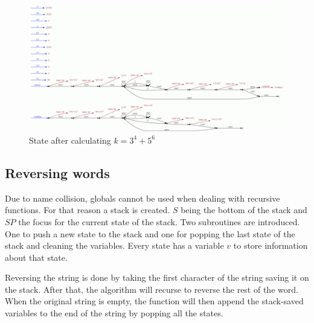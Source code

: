 \documentclass[a4paper,12px]{article}
\begin{document}
\inputminted[bgcolor=bg]{C}{power.mspea}

\begin{figure}[h]
    \centering
    \includegraphics[width=0.8\linewidth]{power_mspea.png}
    \caption{State after calculating $k = 3^4 + 5^6$}
\end{figure}
\FloatBarrier%

\subsection{Reversing words}
Due to name collision, globals cannot be used when dealing with recursive functions. For that reason a stack is created. $S$ being the bottom of the stack and $SP$ the focus for the current state of the stack. Two subroutines are introduced. One to push a new state to the stack and one for popping the last state of the stack and cleaning the variables. Every state has a variable $v$ to store information about that state.

Reversing the string is done by taking the first character of the string saving it on the stack. After that, the algorithm will recurse to reverse the rest of the word. When the original string is empty, the function will then append the stack-saved variables to the end of the string by popping all the states.

\inputminted[bgcolor=bg]{C}{reverse.mspea}
\end{document}
